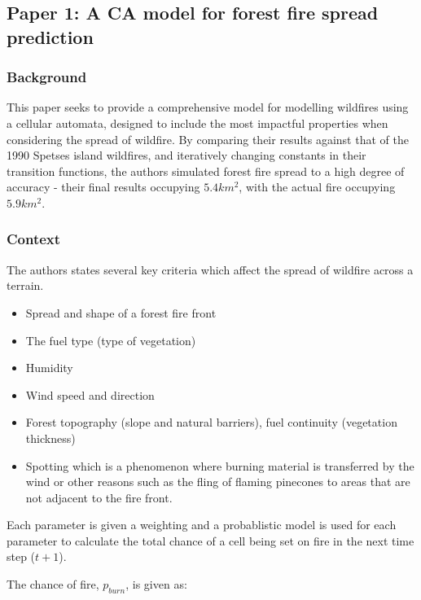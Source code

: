 \documentclass[11pt, a4paper, titlepage]{article}
\begin{document}
  \subsection[Paper 1: A CA model for forest fire spread prediction]{ Paper 1: A CA model for forest fire spread prediction \cite{ALEXANDRIDIS2008191}}
  
    \subsubsection{Background}
 
    This paper seeks to provide a comprehensive model for modelling wildfires using a cellular automata, designed to include the most impactful properties when considering the spread of wildfire. By comparing their results against that of the 1990 Spetses island wildfires, and iteratively changing constants in their transition functions, the authors simulated forest fire spread to a high degree of accuracy - their final results occupying $5.4km^2$, with the actual fire occupying $5.9km^2$.
  
    \subsubsection{Context}  
    The authors states several key criteria which affect the spread of wildfire across a terrain.
    \begin{itemize}

      \item Spread and shape of a forest fire front
      \item The fuel type (type of vegetation)
      \item Humidity
      \item Wind speed and direction
      \item Forest topography (slope and natural barriers), fuel continuity (vegetation thickness)
      \item Spotting which is a phenomenon where burning material is transferred by the wind or other reasons such as the fling of flaming pinecones to areas that are not adjacent to the fire front.
    \end{itemize}
    
    Each parameter is given a weighting and a probablistic model is used for each parameter to calculate the total chance of a cell being set on fire in the next time step ($t+1$).

    The chance of fire, $p_{burn}$, is given as:
\end{document}
